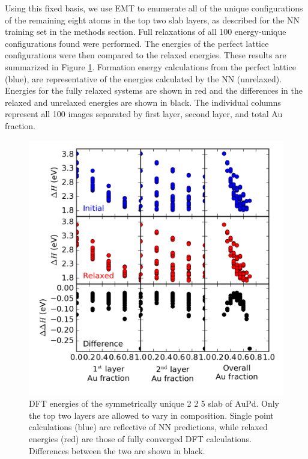 \documentclass[12pt,oneside]{cmuthesis}
\begin{document}
Using this fixed basis, we use EMT to enumerate all of the unique configurations of the remaining eight atoms in the top two slab layers, as described for the NN training set in the methods section. Full relaxations of all 100 energy-unique configurations found were performed. The energies of the perfect lattice configurations were then compared to the relaxed energies. These results are summarized in Figure \ref{fig-DFT-segregation}. Formation energy calculations from the perfect lattice (blue), are representative of the energies calculated by the NN (unrelaxed). Energies for the fully relaxed systems are shown in red and the differences in the relaxed and unrelaxed energies are shown in black. The individual columns represent all 100 images separated by first layer, second layer, and total Au fraction.

\begin{figure}[h]
\centering
\includegraphics[width=5.5in]{./images/DFT-segregation.png}
\caption{\label{fig-DFT-segregation}
DFT energies of the symmetrically unique 2 \texttimes{} 2 \texttimes{} 5 slab of AuPd. Only the top two layers are allowed to vary in composition. Single point calculations (blue) are reflective of NN predictions, while relaxed energies (red) are those of fully converged DFT calculations. Differences between the two are shown in black.}
\end{figure}
\end{document}
